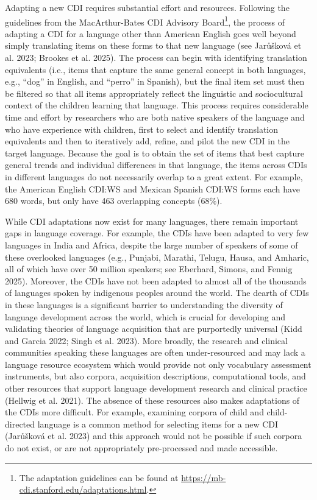 \documentclass[
  letterpaper,
  DIV=11,
  numbers=noendperiod]{scrartcl}
\begin{document}
Adapting a new CDI requires substantial effort and resources. Following
the guidelines from the MacArthur-Bates CDI Advisory Board\footnote{The
  adaptation guidelines can be found at
  \url{https://mb-cdi.stanford.edu/adaptations.html}.}, the process of
adapting a CDI for a language other than American English goes well
beyond simply translating items on these forms to that new language (see
Jarůšková et al. 2023; Brookes et al. 2025). The process can begin with
identifying translation equivalents (i.e., items that capture the same
general concept in both languages, e.g., ``dog'' in English, and
``perro'' in Spanish), but the final item set must then be filtered so
that all items appropriately reflect the linguistic and sociocultural
context of the children learning that language. This process requires
considerable time and effort by researchers who are both native speakers
of the language and who have experience with children, first to select
and identify translation equivalents and then to iteratively add,
refine, and pilot the new CDI in the target language. Because the goal
is to obtain the set of items that best capture general trends and
individual differences in that language, the items across CDIs in
different languages do not necessarily overlap to a great extent. For
example, the American English CDI:WS and Mexican Spanish CDI:WS forms
each have 680 words, but only have 463 overlapping concepts (68\%).

While CDI adaptations now exist for many languages, there remain
important gaps in language coverage. For example, the CDIs have been
adapted to very few languages in India and Africa, despite the large
number of speakers of some of these overlooked languages (e.g., Punjabi,
Marathi, Telugu, Hausa, and Amharic, all of which have over 50 million
speakers; see Eberhard, Simons, and Fennig 2025). Moreover, the CDIs
have not been adapted to almost all of the thousands of languages spoken
by indigenous peoples around the world. The dearth of CDIs in these
languages is a significant barrier to understanding the diversity of
language development across the world, which is crucial for developing
and validating theories of language acquisition that are purportedly
universal (Kidd and Garcia 2022; Singh et al. 2023). More broadly, the
research and clinical communities speaking these languages are often
under-resourced and may lack a language resource ecosystem which would
provide not only vocabulary assessment instruments, but also corpora,
acquisition descriptions, computational tools, and other resources that
support language development research and clinical practice (Hellwig et
al. 2021). The absence of these resources also makes adaptations of the
CDIs more difficult. For example, examining corpora of child and
child-directed language is a common method for selecting items for a new
CDI (Jarůšková et al. 2023) and this approach would not be possible if
such corpora do not exist, or are not appropriately pre-processed and
made accessible.
\end{document}
